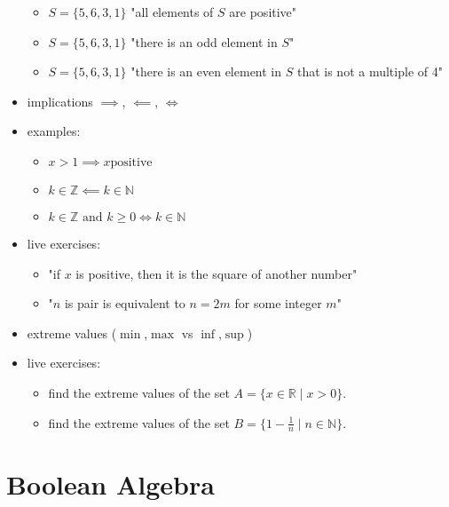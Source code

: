 \documentclass[a4paper,12pt]{article}
\providecommand{\tightlist}{\setlength{\itemsep}{0pt}\setlength{\parskip}{0pt}}
\newcommand{\N}{\mathbb{N}}
\newcommand{\Z}{\mathbb{Z}}
\newcommand{\R}{\mathbb{R}}
\newcommand{\txtand}{\text{ and }}
\begin{document}
\begin{itemize}
	\begin{itemize}
		\tightlist
		\item
		\(S = \{5,6,3,1\}\) "all elements of \(S\) are positive"
		\item
		\(S = \{5,6,3,1\}\) "there is an odd element in \(S\)"
		\item
		\(S = \{5,6,3,1\}\) "there is an even element in \(S\) that is not a
		multiple of 4"
	\end{itemize}
	\item
	implications \(\implies\), \(\impliedby\), \(\iff\)
	\item
	examples:
	
	\begin{itemize}
		\tightlist
		\item
		\(x>1 \implies x \text{positive}\)
		\item
		\(k \in \Z \impliedby k \in \N\)
		\item
		\(k \in \Z  \txtand k\geq 0 \iff k \in \N\)
	\end{itemize}
	\item
	live exercises:
	
	\begin{itemize}
		\tightlist
		\item
		"if \(x\) is positive, then it is the square of another number"
		\item
		"\(n\) is pair is equivalent to \(n=2m\) for some integer \(m\)"
	\end{itemize}
	\item
	extreme values (\(\min\),\(\max\) vs \(\inf\),\(\sup\))
	\item
	live exercises:
	
	\begin{itemize}
		\tightlist
		\item
		find the extreme values of the set \(A = \{x \in \R \mid x>0\}\).
		\item
		find the extreme values of the set
		\(B = \{1-\frac{1}{n} \mid n\in \N\}\).
	\end{itemize}
	\end{itemize}
	
	
	
	
	
	
	\section{Boolean Algebra}
	
\end{document}
